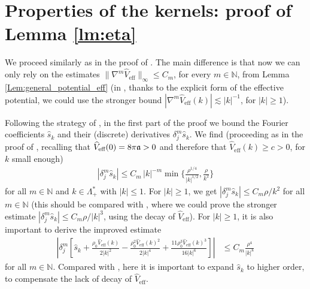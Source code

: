 \documentclass[a4paper,11pt]{article}
\def\bN{\mathbb{N}}
\numberwithin{equation}{section}
\begin{document}
\appendix

\section{Properties of the kernels: proof of Lemma \ref{lm:eta}}
\label{app:kernels}

We proceed similarly as in the proof of \cite[Lemma 2.2]{BBCOS}. The main difference is that now we can only rely on the estimates $\| \nabla^m \widehat{V}_\text{eff} \|_\infty \leq C_m$, for every $m \in \bN$, from Lemma \ref{Lem:general_potential_eff} (in \cite{BBCOS}, thanks to the explicit form of the effective potential, we could use the stronger bound $|\nabla^m \widehat{V}_\text{eff} (k)| \lesssim |k|^{-1}$, for $|k| \geq 1$). 

Following the strategy of \cite{BBCOS}, in the first part of the proof we bound the Fourier coefficients $\widehat{s}_k$ and their (discrete) derivatives $\delta_j^m \widehat{s}_k$. We find (proceeding as in the proof of \cite[Lemma 2.2]{BBCOS}, recalling that $\widehat{V}_\text{eff} (0) = 8 \pi \frak{a} > 0$ and therefore that $\widehat{V}_\text{eff} (k) \geq c > 0$, for $k$ small enough) 
\begin{align}
\label{eq:sfourier_I}
    |\delta_j^m \widehat{s}_k| \leq C_m \, |k|^{-m} \min \Big\{  \frac{\rho^{1/4}}{|k|^{1/2}} , \frac{\rho}{k^2} \Big\} 
\end{align}
for all $m\in \mathbb N$ and $k\in \Lambda^*_+$ with $|k|\leq 1$. For $|k| \geq 1$, we get $|\delta_j^m \widehat{s}_k| \leq C_m \rho / k^2$ for all $m \in \bN$ (this should be compared with \cite[(A.8)]{BBCOS}, where we could prove the stronger estimate $|\delta_j^m \widehat{s}_k| \leq C_m \rho / |k|^3$, using the decay of $\widehat{V}_\text{eff}$). For $|k| \geq 1$, it is also important to derive the improved estimate 
\begin{align}
\label{eq:sfourier_II}
   \left| \delta_j^m\left[ \widehat{s}_k+\frac{\rho_0 \widehat{V}_\mathrm{eff}(k)}{2|k|^2}-\frac{\rho_0^2 \widehat{V}_\mathrm{eff}(k)^2}{2|k|^4}+\frac{11 \rho_0^3 \widehat{V}_\mathrm{eff}(k)^3}{16|k|^6} \right]\right| & \leq C_m \frac{\rho^4}{|k|^8} 
\end{align}
for all $m\in \bN$. Compared with \cite[(A.9)]{BBCOS}, here it is important to expand $\widehat{s}_k$ to higher order, to compensate the lack of decay of $\widehat{V}_\text{eff}$. 
\end{document}

